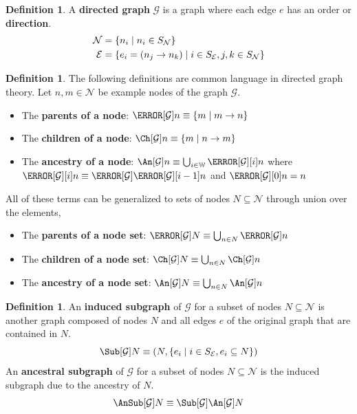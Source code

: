 \documentclass[aps, 10pt, english, twoside, pra, nofootinbib, longbibliography]{revtex4-1}
\theoremstyle{plain}
\theoremstyle{definition}
\newtheorem{definition}[theorem]{Definition}
\theoremstyle{remark}
\newcommand{\graph}{\mathcal{G}}
\newcommand{\nodes}{\mathcal{N}}
\newcommand{\edges}{\mathcal{E}}
\newcommand{\ind}{S}
\newcommand{\term}[1]{\textcolor{Mahogany}{\textbf{#1}}}
\begin{document}
    \begin{definition}
        \label{def:directed_graph}
        A \term{directed graph} $\graph$ is a graph where each edge $e$ has an order or \term{direction}.
        \begin{align*}
            \nodes &= \bc{n_i \mid n_i \in \ind_{\nodes}} \\
            \edges &= \bc{e_i = \br{n_j \to n_k} \mid i \in \ind_{\edges}, j,k \in \ind_{\nodes}}
        \end{align*}
    \end{definition}

    \begin{definition}
        \label{def:graph_terms}
        The following definitions are common language in directed graph theory. Let $n, m \in \nodes$ be example nodes of the graph $\graph$.
        \begin{itemize}
            \item The \term{parents of a node}: $\Pa[\graph]{n} \defined \bc{m \mid m \to n}$
            \item The \term{children of a node}: $\Ch[\graph]{n} \defined \bc{m \mid n \to m}$
            \item The \term{ancestry of a node}: $\An[\graph]{n} \defined \bigcup_{i\in\mathbb{W}} \Pa[\graph][i]{n}$ where $\Pa[\graph][i]{n} \defined \Pa[\graph]{\Pa[\graph][i-1]{n}}$ and $\Pa[\graph][0]{n} = n$
        \end{itemize}
        All of these terms can be generalized to sets of nodes $N \subseteq \nodes$ through union over the elements,
        \begin{itemize}
            \item The \term{parents of a node set}: $\Pa[\graph]{N} \defined \bigcup_{n\in N}\Pa[\graph]{n}$
            \item The \term{children of a node set}: $\Ch[\graph]{N} \defined \bigcup_{n\in N}\Ch[\graph]{n}$
            \item The \term{ancestry of a node set}: $\An[\graph]{N} \defined \bigcup_{n\in N}\An[\graph]{n}$
        \end{itemize}
    \end{definition}

    \begin{definition}
        An \term{induced subgraph} of $\graph$ for a subset of nodes $N \subseteq \nodes$ is another graph composed of nodes $N$ and all edges $e$ of the original graph that are contained in $N$.
        \[ \Sub[\graph]{N} \defined \br{N, \bc{e_i \mid i \in \ind_\edges, e_i \subseteq N}} \]
        An \term{ancestral subgraph} of $\graph$ for a subset of nodes $N \subseteq \nodes$ is the induced subgraph due to the ancestry of $N$.
        \[ \AnSub[\graph]{N} \defined \Sub[\graph]{\An[\graph]{N}} \]
    \end{definition}
\end{document}
